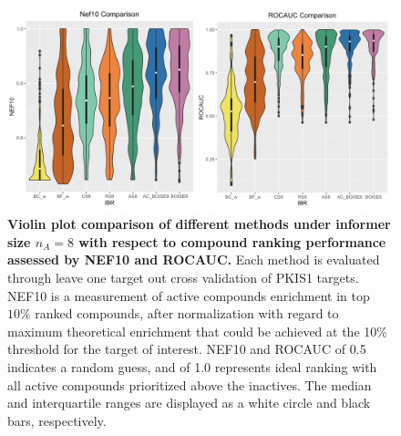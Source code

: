 \documentclass[12pt]{article}
\begin{document}
\begin{figure}[!ht]
\centering
\includegraphics[width=5.0in]{PKIS1_8_eval.png}
\caption{\label{fig:pkis8} 
{\bf Violin plot comparison of different methods under informer size $n_A =8$ with respect to compound ranking performance assessed by NEF10 and ROCAUC.} Each method is evaluated through leave one target out cross validation of PKIS1 targets. NEF10 is a measurement of active compounds enrichment in top $10\%$ ranked compounds, after normalization with regard to maximum theoretical enrichment that could be achieved at the 10\% threshold for the target of interest. NEF10 and ROCAUC of 0.5 indicates a random guess, and of 1.0 represents ideal ranking with all active compounds prioritized above the inactives. The median and interquartile ranges are displayed as a white circle and black bars, respectively.}
\end{figure}
\end{document}
